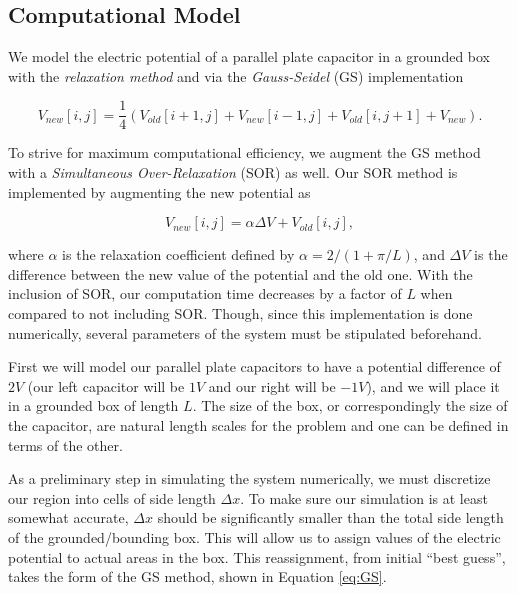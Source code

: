 \documentclass{report}
\begin{document}
        \subsection{Computational Model}

            We model the electric potential of a parallel plate capacitor in a grounded box with the \emph{relaxation method} and via the \emph{Gauss-Seidel} (GS) implementation
        
            \begin{equation} \label{eq:GS}
                V_{new}[i,j]=\frac{1}{4}(V_{old}[i+1,j] +V_{new}[i-1,j]+V_{old}[i,j+1]+V_{new}).
            \end{equation}
            
            To strive for maximum computational efficiency, we augment the GS method with a \emph{Simultaneous Over-Relaxation} (SOR) as well. Our SOR method is implemented by augmenting the new potential as 
            
            \begin{equation} \label{eq:SOR}
                V_{new}[i,j]=\alpha \Delta V +V_{old}[i,j],
            \end{equation}
            
            where $\alpha$ is the relaxation coefficient defined by $\alpha = 2 / (1+ \pi / L)$, and $\Delta V$ is the difference between the new value of the potential and the old one.  With the inclusion of SOR, our computation time decreases by a factor of $L$ when compared to not including SOR.  Though, since this implementation is done numerically, several parameters of the system must be stipulated beforehand.
            
            First we will model our parallel plate capacitors to have a potential difference of $2 V$ (our left capacitor will be $1 V$ and our right will be $-1 V$), and we will place it in a grounded box of length $L$.  The size of the box, or correspondingly the size of the capacitor, are natural length scales for the problem and one can be defined in terms of the other.
            
            As a preliminary step in simulating the system numerically, we must discretize our region into cells of side length $\Delta x$.  To make sure our simulation is at least somewhat accurate, $\Delta x$ should be significantly smaller than the total side length of the grounded/bounding box. This will allow us to assign values of the electric potential to actual areas in the box.  This reassignment, from initial ``best guess'', takes the form of the GS method, shown in Equation \ref{eq:GS}.
\end{document}
